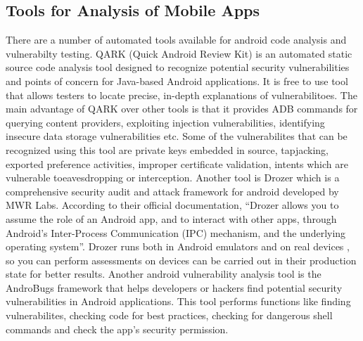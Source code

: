 \documentclass{mproj}
\begin{document}

\subsection{Tools for Analysis of Mobile Apps}

There are a number of automated tools available for android code analysis and vulnerabilty testing. QARK (Quick Android Review Kit) is an automated static source code analysis tool designed to recognize potential security vulnerabilities and points of concern for Java-based Android applications\cite{qark}. It is free to use tool that allows testers to locate precise, in-depth explanations of vulnerabilitoes.  The main advantage of QARK over other tools is that it provides  ADB commands for querying content providers, exploiting injection vulnerabilities, identifying insecure data storage vulnerabilities etc. Some of the vulnerabilites that can be recognized using this tool are private keys embedded in source, tapjacking, exported preference activities, improper certificate validation, intents which are vulnerable toeavesdropping or interception. Another tool is Drozer which is a comprehensive security audit and attack framework for android developed by MWR Labs. According to their official documentation, “Drozer allows you to assume the role of an Android app, and to interact with other apps, through Android’s Inter-Process Communication (IPC) mechanism, and the underlying operating system”\cite{drozer}. Drozer runs both in Android emulators and on real devices , so you can perform assessments on devices can be carried out in their production state for better results. Another android vulnerability analysis tool is the AndroBugs framework that helps developers or hackers find potential security vulnerabilities in Android applications. This tool performs functions like finding vulnerabilites, checking code for best practices, checking for dangerous shell commands and check the app's security permission\cite{androbugs}.
\end{document}
